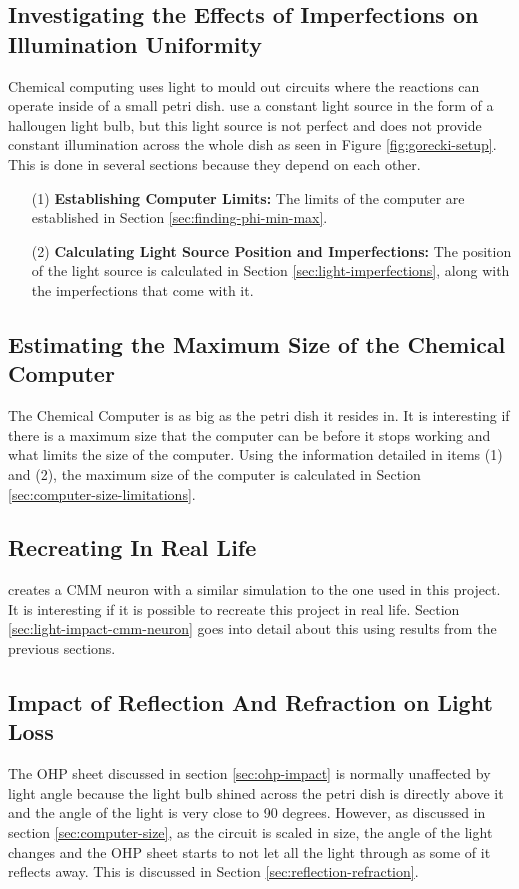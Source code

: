 \subsection{Investigating the Effects of Imperfections on Illumination Uniformity}
Chemical computing uses light to mould out circuits where the reactions can operate inside of a small petri dish. 
\cite{gorecki2003chemical, kuhnert1989image} use a constant light source in the form of a hallougen light bulb, but this light source is not perfect and does not provide constant illumination across the whole dish as seen in Figure \ref{fig:gorecki-setup}.
This is done in several sections because they depend on each other. 
\begin{enumerate}
    \item[(1)] \textbf{Establishing Computer Limits:} The limits of the computer are established in Section \ref{sec:finding-phi-min-max}.
    \item[(2)] \textbf{Calculating Light Source Position and Imperfections:} The position of the light source is calculated in Section \ref{sec:light-imperfections}, along with the imperfections that come with it.
\end{enumerate}

\subsection{Estimating the Maximum Size of the Chemical Computer}
The Chemical Computer is as big as the petri dish it resides in. It is interesting if there is a maximum size that the computer can be before it stops working and 
what limits the size of the computer. 
Using the information detailed in items (1) and (2), the maximum size of the computer is calculated in Section \ref{sec:computer-size-limitations}.

\subsection{Recreating \cite{stovold2017reaction} In Real Life}
\cite{stovold2017reaction} creates a CMM neuron with a similar simulation to the one used in this project. 
It is interesting if it is possible to recreate this project in real life.
Section \ref{sec:light-impact-cmm-neuron} goes into detail about this using results from the previous sections. 

\subsection{Impact of Reflection And Refraction on Light Loss}
The OHP sheet discussed in section \ref{sec:ohp-impact} is normally unaffected by light angle because the light bulb shined across the petri dish is directly above it and the angle of the light is very close to 90 degrees.
However, as discussed in section \ref{sec:computer-size}, as the circuit is scaled in size, the angle of the light changes and the OHP sheet starts to not let all the light through as some of it reflects away.
This is discussed in Section \ref{sec:reflection-refraction}.

